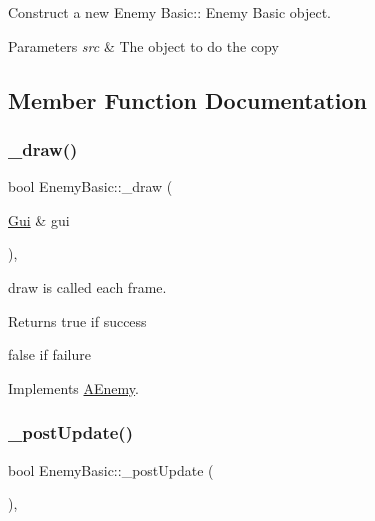 Construct a new Enemy Basic\+:\+: Enemy Basic object. 


\begin{DoxyParams}{Parameters}
{\em src} & The object to do the copy \\
\hline
\end{DoxyParams}


\subsection{Member Function Documentation}
\mbox{\label{class_enemy_basic_a143ec308f913a3eb4a7f47ad839fd049}} 
\subsubsection{\texorpdfstring{\+\_\+draw()}{\_draw()}}
{\footnotesize\ttfamily bool Enemy\+Basic\+::\+\_\+draw (\begin{DoxyParamCaption}\item[{\hyperlink{class_gui}{Gui} \&}]{gui }\end{DoxyParamCaption})\hspace{0.3cm}{\ttfamily [protected]}, {\ttfamily [virtual]}}



draw is called each frame. 

\begin{DoxyReturn}{Returns}
true if success 

false if failure 
\end{DoxyReturn}


Implements \hyperlink{class_a_enemy_a70e3638b5ed8ecea2a087ffe16510dd2}{A\+Enemy}.

\mbox{\label{class_enemy_basic_a8c87a63172fc71e39c821a6d19eb499d}} 
\subsubsection{\texorpdfstring{\+\_\+post\+Update()}{\_postUpdate()}}
{\footnotesize\ttfamily bool Enemy\+Basic\+::\+\_\+post\+Update (\begin{DoxyParamCaption}{ }\end{DoxyParamCaption})\hspace{0.3cm}{\ttfamily [protected]}, {\ttfamily [virtual]}}



